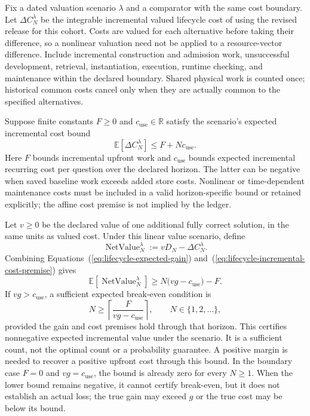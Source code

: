 \documentclass[10pt]{article} %
\renewcommand{\eqref}[1]{\textup{(\ref{#1})}}
\providecommand{\1}{\mathbf{1}}  %
\theoremstyle{remark}
\theoremstyle{definition}
\begin{document}
Fix a dated valuation scenario $\lambda$ and a comparator with the same
cost boundary. Let $\Delta C_N^\lambda$ be the integrable incremental valued
lifecycle cost of using the revised release for this cohort. Costs are
valued for each alternative before taking their difference, so a
nonlinear valuation need not be applied to a resource-vector difference.
Include incremental construction and admission work, unsuccessful
development, retrieval, instantiation, execution, runtime checking, and
maintenance within the declared boundary. Shared physical work is
counted once; historical common costs cancel only when they are
actually common to the specified alternatives.

Suppose finite constants $F\geq0$ and $c_{\mathrm{use}}\in\mathbb R$
satisfy the scenario's expected incremental cost bound
\begin{equation}
\mathbb E[\Delta C_N^\lambda]
\leq F+Nc_{\mathrm{use}}.
\label{eq:lifecycle-incremental-cost-premise}
\end{equation}
Here $F$ bounds incremental upfront work and $c_{\mathrm{use}}$ bounds
expected incremental recurring cost per question over the declared
horizon. The latter can be negative when saved baseline work exceeds
added store costs. Nonlinear or time-dependent maintenance costs must
be included in a valid horizon-specific bound or retained explicitly;
the affine cost premise is not implied by the ledger.

Let $v\geq0$ be the declared value of one additional fully correct
solution, in the same units as valued cost. Under this linear value
scenario, define
\begin{equation}
\operatorname{NetValue}_N^\lambda
:=vD_N-\Delta C_N^\lambda.
\label{eq:lifecycle-net-value-definition}
\end{equation}
Combining Equations~\eqref{eq:lifecycle-expected-gain}
and~\eqref{eq:lifecycle-incremental-cost-premise} gives
\begin{equation}
\mathbb E[\operatorname{NetValue}_N^\lambda]
\geq N\bigl(vg-c_{\mathrm{use}}\bigr)-F.
\label{eq:lifecycle-net-value-bound}
\end{equation}
If $vg>c_{\mathrm{use}}$, a sufficient expected break-even condition is
\begin{equation}
N\geq\left\lceil\frac{F}{vg-c_{\mathrm{use}}}\right\rceil,
\qquad N\in\{1,2,\ldots\},
\label{eq:lifecycle-break-even}
\end{equation}
provided the gain and cost premises hold through that horizon. This
certifies nonnegative expected incremental value under the scenario.
It is a sufficient count, not the optimal count or a probability
guarantee. A positive margin is needed to recover a positive upfront
cost through this bound. In the boundary case $F=0$ and
$vg=c_{\mathrm{use}}$, the bound is already zero for every $N\geq1$.
When the lower bound remains negative, it cannot certify break-even,
but it does not establish an actual loss; the true gain may exceed $g$
or the true cost may be below its bound.
\end{document}
